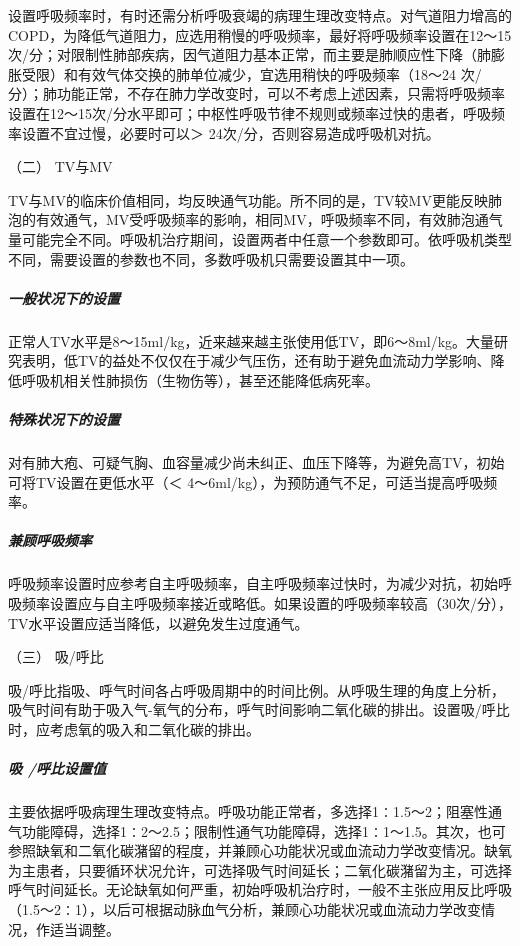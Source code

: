 设置呼吸频率时，有时还需分析呼吸衰竭的病理生理改变特点。对气道阻力增高的COPD，为降低气道阻力，应选用稍慢的呼吸频率，最好将呼吸频率设置在12～15次/分；对限制性肺部疾病，因气道阻力基本正常，而主要是肺顺应性下降（肺膨胀受限）和有效气体交换的肺单位减少，宜选用稍快的呼吸频率（18～24
次/分）；肺功能正常，不存在肺力学改变时，可以不考虑上述因素，只需将呼吸频率设置在12～15次/分水平即可；中枢性呼吸节律不规则或频率过快的患者，呼吸频率设置不宜过慢，必要时可以＞
24次/分，否则容易造成呼吸机对抗。

\hypertarget{text00370.htmlux5cux23CHP16-3-4-1-2}{}
（二） TV与MV

TV与MV的临床价值相同，均反映通气功能。所不同的是，TV较MV更能反映肺泡的有效通气，MV受呼吸频率的影响，相同MV，呼吸频率不同，有效肺泡通气量可能完全不同。呼吸机治疗期间，设置两者中任意一个参数即可。依呼吸机类型不同，需要设置的参数也不同，多数呼吸机只需要设置其中一项。

\subparagraph{一般状况下的设置}

正常人TV水平是8～15ml/kg，近来越来越主张使用低TV，即6～8ml/kg。大量研究表明，低TV的益处不仅仅在于减少气压伤，还有助于避免血流动力学影响、降低呼吸机相关性肺损伤（生物伤等），甚至还能降低病死率。

\subparagraph{特殊状况下的设置}

对有肺大疱、可疑气胸、血容量减少尚未纠正、血压下降等，为避免高TV，初始可将TV设置在更低水平（＜
4～6ml/kg），为预防通气不足，可适当提高呼吸频率。

\subparagraph{兼顾呼吸频率}

呼吸频率设置时应参考自主呼吸频率，自主呼吸频率过快时，为减少对抗，初始呼吸频率设置应与自主呼吸频率接近或略低。如果设置的呼吸频率较高（30次/分），TV水平设置应适当降低，以避免发生过度通气。

\hypertarget{text00370.htmlux5cux23CHP16-3-4-1-3}{}
（三） 吸/呼比

吸/呼比指吸、呼气时间各占呼吸周期中的时间比例。从呼吸生理的角度上分析，吸气时间有助于吸入气-氧气的分布，呼气时间影响二氧化碳的排出。设置吸/呼比时，应考虑氧的吸入和二氧化碳的排出。

\subparagraph{吸 /呼比设置值}

主要依据呼吸病理生理改变特点。呼吸功能正常者，多选择1∶1.5～2；阻塞性通气功能障碍，选择1∶2～2.5；限制性通气功能障碍，选择1∶1～1.5。其次，也可参照缺氧和二氧化碳潴留的程度，并兼顾心功能状况或血流动力学改变情况。缺氧为主患者，只要循环状况允许，可选择吸气时间延长；二氧化碳潴留为主，可选择呼气时间延长。无论缺氧如何严重，初始呼吸机治疗时，一般不主张应用反比呼吸（1.5～2∶1），以后可根据动脉血气分析，兼顾心功能状况或血流动力学改变情况，作适当调整。

